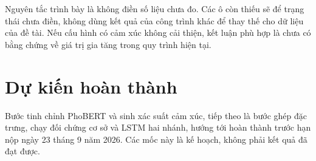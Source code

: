 Nguyên tắc trình bày là không điền số liệu chưa đo. Các ô còn thiếu sẽ để trạng thái
chưa điền, không dùng kết quả của công trình khác để thay thế cho dữ liệu của đề tài.
Nếu cấu hình có cảm xúc không cải thiện, kết luận phù hợp là chưa có bằng chứng về
giá trị gia tăng trong quy trình hiện tại.

\section{Dự kiến hoàn thành}
\label{sec:kq-timeline}

Bước tinh chỉnh PhoBERT và sinh xác suất cảm xúc, tiếp theo là bước ghép đặc trưng,
chạy đối chứng cơ sở và LSTM hai nhánh, hướng tới hoàn thành trước hạn nộp ngày 23
tháng 9 năm 2026. Các mốc này là kế hoạch, không phải kết quả đã đạt được.
